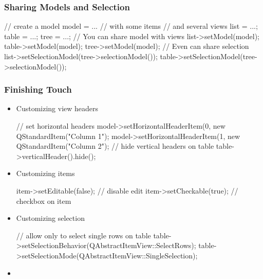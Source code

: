 \begin{slide}[fragile]{}
\frametitle{Sharing Models and Selection}
  \begin{cpp}// create a model
model = ... // with some items
// and several views
list = ...; table = ...; tree = ...;
// You can share model with views
list->setModel(model);
table->setModel(model);
tree->setModel(model);
// Even can share selection
list->setSelectionModel(tree->selectionModel());
table->setSelectionModel(tree->selectionModel());
\end{cpp}
\end{slide}

\begin{slide}[fragile]{}
\frametitle{Finishing Touch}
\begin{itemize}
  \item Customizing view headers
  \begin{cpp}// set horizontal headers
model->setHorizontalHeaderItem(0, new QStandardItem("Column 1");
model->setHorizontalHeaderItem(1, new QStandardItem("Column 2");
// hide vertical headers on table
table->verticalHeader().hide();
\end{cpp}

  \item Customizing items
  \begin{cpp}item->setEditable(false); // disable edit
item->setCheckable(true); // checkbox on item
\end{cpp}

  \item Customizing selection
  \begin{cpp}// allow only to select single rows on table
table->setSelectionBehavior(QAbstractItemView::SelectRows);
table->setSelectionMode(QAbstractItemView::SingleSelection);
\end{cpp}

  \item {}
\end{itemize}
\end{slide}

